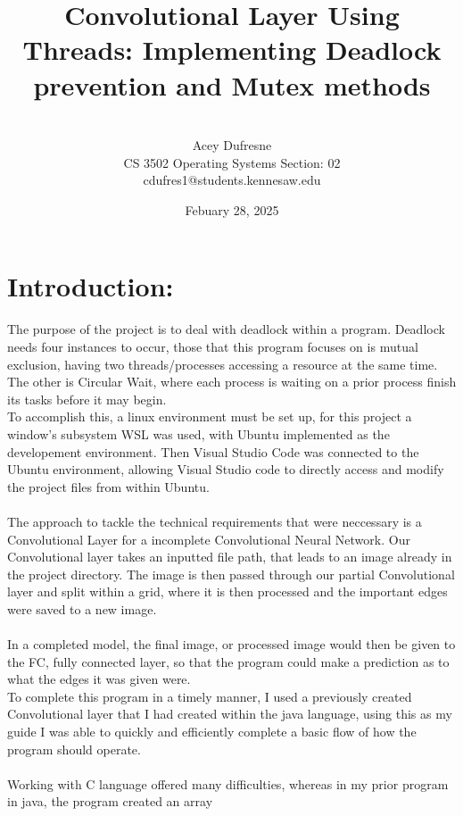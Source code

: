 \documentclass{article}
\title{Convolutional Layer Using Threads: Implementing Deadlock prevention and Mutex methods}
\author{\vspace*{60ex}\\Acey Dufresne\\CS 3502 Operating Systems Section: 02\\cdufres1@students.kennesaw.edu\\}
\date{Febuary 28, 2025}
\begin{document}
\maketitle

\clearpage

\section*{Introduction:\\}
The purpose of the project is to deal with deadlock within a program. Deadlock needs four instances
to occur, those that this program focuses on is mutual exclusion, having two threads/processes accessing
a resource at the same time. The other is Circular Wait, where each process is waiting on a prior process
finish its tasks before it may begin.\vspace{.5cm}\\
To accomplish this, a linux environment must be set up, for this project a window's subsystem WSL was used, with Ubuntu implemented
as the developement environment. Then Visual Studio Code was connected to the Ubuntu environment, allowing 
Visual Studio code to directly access and modify the project files from within Ubuntu.\\\vspace{.5cm}\\
The approach to tackle the technical requirements that were neccessary is a Convolutional Layer for a incomplete
Convolutional Neural Network. Our Convolutional layer takes an inputted file path, that leads to an image already
in the project directory. The image is then passed through our partial Convolutional layer and split within
a grid, where it is then processed and the important edges were saved to a new image.\\\vspace{.5cm}\\
In a completed model, the final image, or processed image would then be given to the FC, fully connected layer,
so that the program could make a prediction as to what the edges it was given were.\\
To complete this program in a timely manner, I used a previously created Convolutional layer that I had created
within the java language, using this as my guide I was able to quickly and efficiently complete a basic 
flow of how the program should operate.\\\vspace{.5cm}\\
Working with C language offered many difficulties, whereas in my prior program in java, the program created an array
\end{document}
